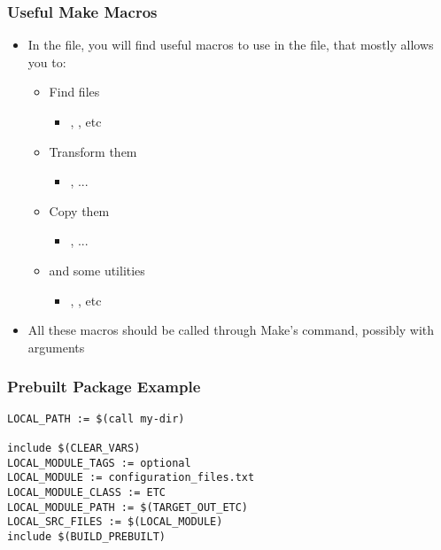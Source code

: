 \begin{frame}
  \frametitle{Useful Make Macros}
  \begin{itemize}
  \item In the  file, you will find
    useful macros to use in the  file, that mostly
    allows you to:
    \begin{itemize}
    \item Find files
      \begin{itemize}
      \item {}, , etc
      \end{itemize}
    \item Transform them
      \begin{itemize}
      \item {}, ...
      \end{itemize}
    \item Copy them
      \begin{itemize}
      \item {}, ...
      \end{itemize}
    \item and some utilities
      \begin{itemize}
      \item {}, , etc
      \end{itemize}
    \end{itemize}
  \item All these macros should be called through Make's  command,
    possibly with arguments
  \end{itemize}
\end{frame}

\begin{frame}[fragile]
  \frametitle{Prebuilt Package Example}
\begin{verbatim}
LOCAL_PATH := $(call my-dir)

include $(CLEAR_VARS)
LOCAL_MODULE_TAGS := optional
LOCAL_MODULE := configuration_files.txt
LOCAL_MODULE_CLASS := ETC
LOCAL_MODULE_PATH := $(TARGET_OUT_ETC)
LOCAL_SRC_FILES := $(LOCAL_MODULE)
include $(BUILD_PREBUILT)
\end{verbatim}
\end{frame}

